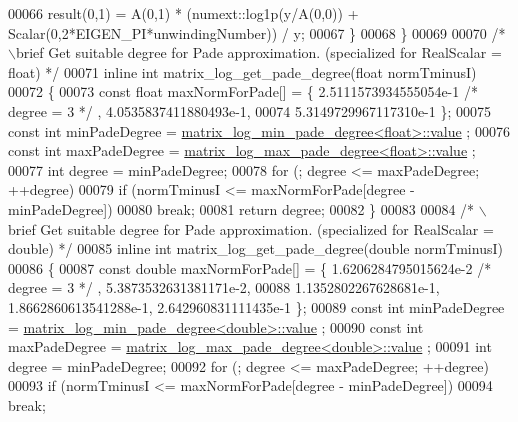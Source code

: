 \begin{DoxyCode}
00066     result(0,1) = A(0,1) * (numext::log1p(y/A(0,0)) + Scalar(0,2*EIGEN\_PI*unwindingNumber)) / y;
00067   \}
00068 \}
00069 
00070 \textcolor{comment}{/* \(\backslash\)brief Get suitable degree for Pade approximation. (specialized for RealScalar = float) */}
00071 \textcolor{keyword}{inline} \textcolor{keywordtype}{int} matrix\_log\_get\_pade\_degree(\textcolor{keywordtype}{float} normTminusI)
00072 \{
00073   \textcolor{keyword}{const} \textcolor{keywordtype}{float} maxNormForPade[] = \{ 2.5111573934555054e-1 \textcolor{comment}{/* degree = 3 */} , 4.0535837411880493e-1,
00074             5.3149729967117310e-1 \};
00075   \textcolor{keyword}{const} \textcolor{keywordtype}{int} minPadeDegree = \hyperlink{struct_eigen_1_1internal_1_1matrix__log__min__pade__degree}{matrix\_log\_min\_pade\_degree<float>::value}
      ;
00076   \textcolor{keyword}{const} \textcolor{keywordtype}{int} maxPadeDegree = \hyperlink{struct_eigen_1_1internal_1_1matrix__log__max__pade__degree}{matrix\_log\_max\_pade\_degree<float>::value}
      ;
00077   \textcolor{keywordtype}{int} degree = minPadeDegree;
00078   \textcolor{keywordflow}{for} (; degree <= maxPadeDegree; ++degree) 
00079     \textcolor{keywordflow}{if} (normTminusI <= maxNormForPade[degree - minPadeDegree])
00080       \textcolor{keywordflow}{break};
00081   \textcolor{keywordflow}{return} degree;
00082 \}
00083 
00084 \textcolor{comment}{/* \(\backslash\)brief Get suitable degree for Pade approximation. (specialized for RealScalar = double) */}
00085 \textcolor{keyword}{inline} \textcolor{keywordtype}{int} matrix\_log\_get\_pade\_degree(\textcolor{keywordtype}{double} normTminusI)
00086 \{
00087   \textcolor{keyword}{const} \textcolor{keywordtype}{double} maxNormForPade[] = \{ 1.6206284795015624e-2 \textcolor{comment}{/* degree = 3 */} , 5.3873532631381171e-2,
00088             1.1352802267628681e-1, 1.8662860613541288e-1, 2.642960831111435e-1 \};
00089   \textcolor{keyword}{const} \textcolor{keywordtype}{int} minPadeDegree = \hyperlink{struct_eigen_1_1internal_1_1matrix__log__min__pade__degree}{matrix\_log\_min\_pade\_degree<double>::value}
      ;
00090   \textcolor{keyword}{const} \textcolor{keywordtype}{int} maxPadeDegree = \hyperlink{struct_eigen_1_1internal_1_1matrix__log__max__pade__degree}{matrix\_log\_max\_pade\_degree<double>::value}
      ;
00091   \textcolor{keywordtype}{int} degree = minPadeDegree;
00092   \textcolor{keywordflow}{for} (; degree <= maxPadeDegree; ++degree)
00093     \textcolor{keywordflow}{if} (normTminusI <= maxNormForPade[degree - minPadeDegree])
00094       \textcolor{keywordflow}{break};

\end{DoxyCode}
